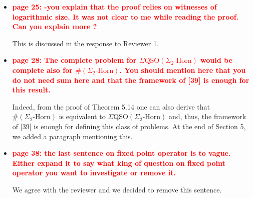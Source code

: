 \documentclass[a4paper]{article}
\newcommand{\red}[1]{{\bf\textcolor{red}{#1}}}
\begin{document}
\begin{itemize}
	\item \red{page 25: 	-you explain that the proof relies on witnesses of logarithmic size.	It was not clear to me while reading the proof. Can you explain more ?}
	
	This is discussed in the response to Reviewer 1. 
	
	\item \red{page 28:	The complete problem for $\Sigma\text{QSO}(\Sigma_2\text{-Horn})$ would be complete also for $\#(\Sigma_2\text{-Horn})$. You should mention here that you do not need sum here and that the framework of [39] is enough for this result.}
	
	Indeed, from the proof of Theorem 5.14 one can also derive that $\#(\Sigma_2\text{-Horn})$ is equivalent to $\Sigma\text{QSO}(\Sigma_2\text{-Horn})$ and, thus, the framework of [39] is enough for defining this class of problems. At the end of Section 5, we added a paragraph mentioning this. 
	
	\item \red{page 38: the last sentence on fixed point operator is to vague. Either expand it to say what king of question on fixed point operator you want to investigate or remove it.}
	
	We agree with the reviewer and we decided to remove this sentence. 
\end{itemize}




	
\end{document}

